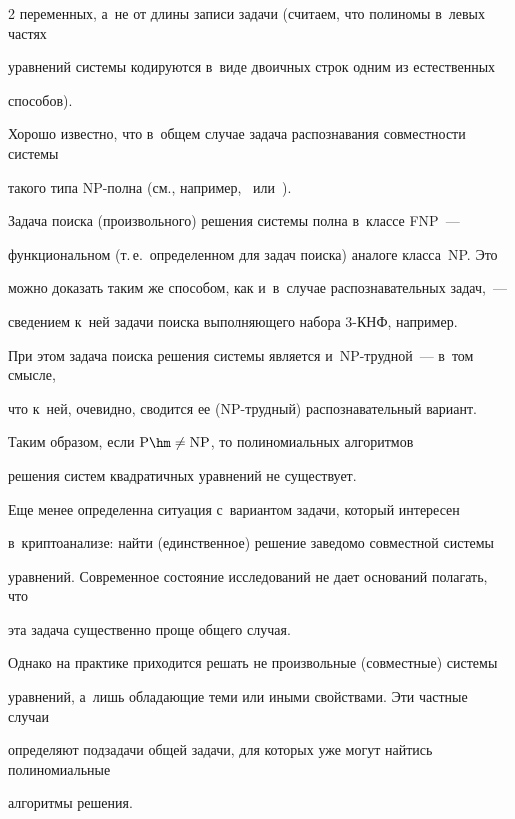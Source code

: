 \begin{multicols}{2}
переменных, а~не от длины записи задачи (считаем, что полиномы в~левых частях 


уравнений системы кодируются в~виде двоичных строк одним из естественных 


способов).





Хорошо известно, что в~общем случае задача распознавания совместности системы 


такого типа NP-пол\-на (см., например,~\cite{FY1980} или~\cite[с.~321]{GJ1982}).


Задача поиска (произвольного) решения системы полна в~классе FNP~--- 


функциональном (т.\,е.\ определенном для задач поиска) аналоге класса~NP. Это 


можно доказать таким же способом, как и~в~случае распознавательных задач,~--- 


сведением к~ней задачи поиска выполняющего набора \mbox{3-КНФ}, например.


При этом задача поиска решения системы является и~NP-труд\-ной~--- в~том смысле, 


что к~ней, очевидно, сводится ее (NP-труд\-ный) распознавательный вариант.


Таким образом, если $\mathrm{P}\hm\neq\mathrm{NP}$, то полиномиальных алгоритмов 


решения систем квадратичных уравнений не существует.





Еще менее определенна ситуация с~вариантом задачи, который интересен 


в~криптоанализе: \mbox{найти} (единственное) решение заведомо совместной сис\-те\-мы 


уравнений. Современное состояние исследований не дает оснований полагать, что 


эта задача существенно проще общего случая.





Однако на практике приходится решать не произвольные (совместные) системы 


уравнений, а~лишь обладающие теми или иными свойствами. Эти частные случаи 


определяют подзадачи общей задачи, для которых уже могут найтись полиномиальные 


алгоритмы решения.






\end{multicols}
